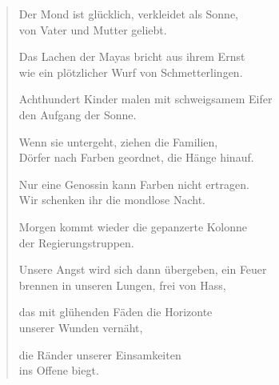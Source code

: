 
\cleartoverso


\vspace*{-1em}
\begin{verse}

Der Mond ist glücklich, verkleidet als Sonne,\\
von Vater und Mutter geliebt.

Das Lachen der Mayas bricht aus ihrem Ernst\\
wie ein plötzlicher Wurf von Schmetterlingen.

Achthundert Kinder malen mit schweigsamem Eifer\\
den Aufgang der Sonne.

Wenn sie untergeht, ziehen die Familien,\\
Dörfer nach Farben geordnet, die Hänge hinauf.

Nur eine Genossin kann Farben nicht ertragen.\\
Wir schenken ihr die mondlose Nacht.

Morgen kommt wieder die gepanzerte Kolonne\\
der Regierungstruppen.

Unsere Angst wird sich dann übergeben, ein Feuer\\
brennen in unseren Lungen, frei von Hass,

das mit glühenden Fäden die Horizonte\\
unserer Wunden vernäht,

die Ränder unserer Einsamkeiten\\
ins Offene biegt.

\end{verse}

\clearpage



